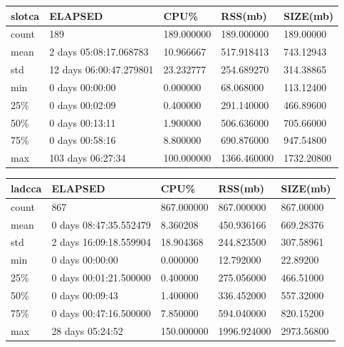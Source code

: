 \documentclass{article}
\begin{document}
\begin{tabular}{|l|l|l|l|l|}
\hline 
\hline slotca&    ELAPSED&   CPU\%&  RSS(mb)&   SIZE(mb) \\
\hline count&   189& 189.000000&  189.000000&  189.00000 \\
\hline mean&  2 days 05:08:17.068783&  10.966667&  517.918413&  743.12943 \\
\hline std&  12 days 06:00:47.279801&  23.232777&  254.689270&  314.38865 \\
\hline min&   0 days 00:00:00&  0.000000&  68.068000&  113.12400 \\
\hline 25\%&   0 days 00:02:09&  0.400000&  291.140000&  466.89600 \\
\hline 50\%&   0 days 00:13:11&  1.900000&  506.636000&  705.66000 \\
\hline 75\%&   0 days 00:58:16&  8.800000&  690.876000&  947.54800 \\
\hline max&  103 days 06:27:34& 100.000000& 1366.460000& 1732.20800 \\
\hline 
\end{tabular}
 
\begin{tabular}{|l|l|l|l|l|}
\hline 
\hline ladcca& ELAPSED&   CPU\%&  RSS(mb)&   SIZE(mb) \\
\hline count&    867& 867.000000&  867.000000&  867.00000 \\
\hline mean&  0 days 08:47:35.552479&  8.360208&  450.936166&  669.28376 \\
\hline std&  2 days 16:09:18.559904&  18.904368&  244.823500&  307.58961 \\
\hline min&   0 days 00:00:00&  0.000000&  12.792000&  22.89200 \\
\hline 25\%&  0 days 00:01:21.500000&  0.400000&  275.056000&  466.51000 \\
\hline 50\%&   0 days 00:09:43&  1.400000&  336.452000&  557.32000 \\
\hline 75\%&  0 days 00:47:16.500000&  7.850000&  594.040000&  820.15200 \\
\hline max&  28 days 05:24:52& 150.000000& 1996.924000& 2973.56800 \\
\hline 
\end{tabular}
 
\end{document}
